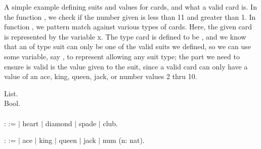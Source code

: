 
A simple example defining suits and values for cards, and what a valid card is. In the function , we check if the number given is less than 11 and greater than 1. In function , we pattern match against various types of cards. Here, the given card is represented by the variable x. The type card is defined to be , and we know that an  of type suit can only be one of the valid suits we defined, so we can use some variable, say , to represent allowing any suit type; the part we need to ensure is valid is the value given to the suit, since a valid card can only have a value of an ace, king, queen, jack, or number values 2 thru 10.

\begin{code}
\Load List. 	\\
\Load Bool.
\\ \\
\Inductive {} : \Type :=
  $\mid$ heart
  $\mid$ diamond
  $\mid$ spade
  $\mid$ club.

\Inductive {} : \Type :=
  $\mid$ ace
  $\mid$ king
  $\mid$ queen
  $\mid$ jack
  $\mid$ num (n: nat).


\end{code}
